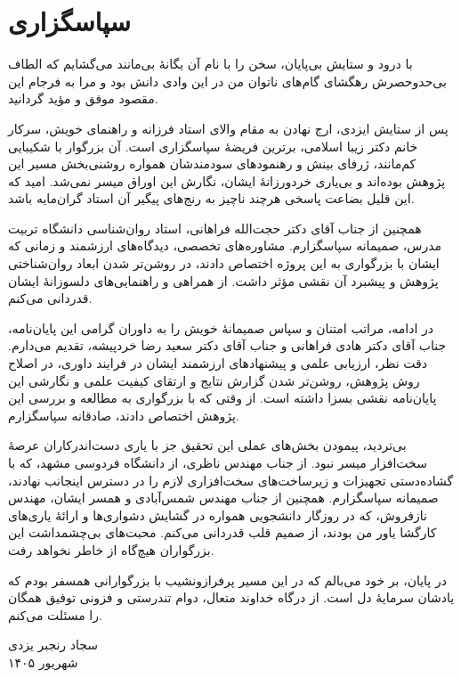 \chapter*{سپاسگزاری}
با درود و ستایش بی‌پایان، سخن را با نام آن یگانۀ بی‌مانند می‌گشایم که الطاف بی‌حدوحصرش رهگشای گام‌های ناتوان من در این وادی دانش بود و مرا به فرجام این مقصود موفق و مؤید گردانید.

پس از ستایش ایزدی، ارج نهادن به مقام والای استاد فرزانه و راهنمای خویش، سرکار خانم دکتر زیبا اسلامی، برترین فریضۀ سپاسگزاری است. آن بزرگوار با شکیبایی کم‌مانند، ژرفای بینش و رهنمودهای سودمندشان همواره روشنی‌بخش مسیر این پژوهش بوده‌اند و بی‌یاری خردورزانۀ ایشان، نگارش این اوراق میسر نمی‌شد. امید که این قلیل بضاعت پاسخی هرچند ناچیز به رنج‌های پیگیر آن استاد گران‌مایه باشد.

همچنین از جناب آقای دکتر حجت‌الله فراهانی، استاد روان‌شناسی دانشگاه تربیت مدرس، صمیمانه سپاسگزارم. مشاوره‌های تخصصی، دیدگاه‌های ارزشمند و زمانی که ایشان با بزرگواری به این پروژه اختصاص دادند، در روشن‌تر شدن ابعاد روان‌شناختی پژوهش و پیشبرد آن نقشی مؤثر داشت. از همراهی و راهنمایی‌های دلسوزانۀ ایشان قدردانی می‌کنم.

در ادامه، مراتب امتنان و سپاس صمیمانۀ خویش را به داوران گرامی این پایان‌نامه، جناب آقای دکتر هادی فراهانی و جناب آقای دکتر سعید رضا خردپیشه، تقدیم می‌دارم. دقت نظر، ارزیابی علمی و پیشنهادهای ارزشمند ایشان در فرایند داوری، در اصلاح روش پژوهش، روشن‌تر شدن گزارش نتایج و ارتقای کیفیت علمی و نگارشی این پایان‌نامه نقشی بسزا داشته است. از وقتی که با بزرگواری به مطالعه و بررسی این پژوهش اختصاص دادند، صادقانه سپاسگزارم.

بی‌تردید، پیمودن بخش‌های عملی این تحقیق جز با یاری دست‌اندرکاران عرصۀ سخت‌افزار میسر نبود. از جناب مهندس ناظری، از دانشگاه فردوسی مشهد، که با گشاده‌دستی تجهیزات و زیرساخت‌های سخت‌افزاری لازم را در دسترس اینجانب نهادند، صمیمانه سپاسگزارم. همچنین از جناب مهندس شمس‌آبادی و همسر ایشان، مهندس نازفروش، که در روزگار دانشجویی همواره در گشایش دشواری‌ها و ارائۀ یاری‌های کارگشا یاور من بودند، از صمیم قلب قدردانی می‌کنم. محبت‌های بی‌چشمداشت این بزرگواران هیچ‌گاه از خاطر نخواهد رفت.

در پایان، بر خود می‌بالم که در این مسیر پرفرازونشیب با بزرگوارانی همسفر بودم که یادشان سرمایۀ دل است. از درگاه خداوند متعال، دوام تندرستی و فزونی توفیق همگان را مسئلت می‌کنم.

\begin{flushleft}
سجاد رنجبر یزدی\\
شهریور ۱۴۰۵
\end{flushleft}
